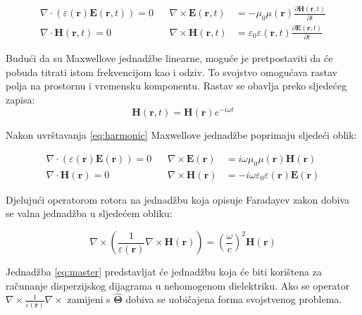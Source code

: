\documentclass[utf8, seminar]{fer}
\begin{document}
\begin{align} \label{eq:maxwell2}
	\nabla \cdot (\varepsilon(\mathbf{r}) \mathbf{E}(\mathbf{r}, t)) = 0 &&
	\nabla \times \mathbf{E}(\mathbf{r}, t) &=
		- \mu_0 \mu(\mathbf{r})
		\frac{\partial \mathbf{H}(\mathbf{r}, t)}{\partial t}  \nonumber \\
	\nabla \cdot \mathbf{H}(\mathbf{r}, t) = 0 &&
	\nabla \times \mathbf{H}(\mathbf{r}, t) &=
		\varepsilon_0 \varepsilon(\mathbf{r}, t)
		\frac{\partial \mathbf{E}(\mathbf{r}, t)}{\partial t}
\end{align}

Budući da su Maxwellove jednadžbe linearne, moguće je pretpostaviti da će pobuda
titrati istom frekvencijom kao i odziv. To svojstvo omogućava rastav polja
na prostornu i vremensku komponentu. Rastav se obavlja preko sljedećeg zapisa:
\begin{equation} \label{eq:harmonic}
	\mathbf{H}(\mathbf{r}, t) = \mathbf{H}(\mathbf{r}) e^{-i \omega t}
\end{equation}

Nakon uvrštavanja \ref{eq:harmonic} Maxwellove jednadžbe poprimaju sljedeći
oblik:

\begin{align} \label{eq:maxwell3}
	\nabla \cdot (\varepsilon(\mathbf{r}) \mathbf{E}(\mathbf{r})) = 0 &&
	\nabla \times \mathbf{E}(\mathbf{r}) &=
		i \omega \mu_0 \mu(\mathbf{r})\mathbf{H}(\mathbf{r})  \nonumber \\
	\nabla \cdot \mathbf{H}(\mathbf{r}) = 0 &&
	\nabla \times \mathbf{H}(\mathbf{r}) &=
		- i \omega \varepsilon_0 \varepsilon(\mathbf{r})\mathbf{E}(\mathbf{r})
\end{align}

Djelujući operatorom rotora na jednadžbu koja opisuje Faradayev zakon dobiva
se valna jednadžba u sljedećem obliku:

\begin{equation} \label{eq:master}
	\nabla \times \left(\frac{1}{\varepsilon(\mathbf{r})}\nabla
			\times \mathbf{H}(\mathbf{r}) \right)
	= \left( \frac{\omega}{c} \right)^2 \mathbf{H}(\mathbf{r})
\end{equation}

Jednadžba \ref{eq:master} predstavljat će jednadžbu koja će biti korištena za
računanje disperzijskog dijagrama u nehomogenom dielektriku.
Ako se operator ${\nabla \times \frac{1}{\varepsilon(\mathbf{r})} \nabla \times}$
zamijeni s $\hat{\mathbf{\Theta}}$ dobiva se uobičajena forma svojstvenog
problema.
\end{document}
